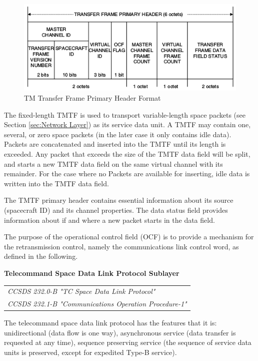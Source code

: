 \begin{figure}[h]
\centering\includegraphics[scale=0.6]{fig/tm_transfer_frame_primary_header_format}
\caption{TM Transfer Frame Primary Header Format}
\label{fig:TM Transfer Frame Primary Header Format}
\end{figure}

The fixed-length TMTF is used to transport variable-length space packets (see Section \ref{sec:Network Layer}) as its service data unit. A TMTF may contain one, several, or zero space packets (in the later case it only contains idle data). Packets are concatenated and inserted into the TMTF until its length is exceeded. Any packet that exceeds the size of the TMTF data field will be split, and starts a new TMTF data field on the same virtual channel with its remainder. For the case where no Packets are available for inserting, idle data is written into the TMTF data field.

The TMTF primary header contains essential information about its source (spacecraft ID) and its channel properties. The data status field provides information about if and where a new packet starts in the data field.

The purpose of the operational control field (OCF) is to provide a mechanism for the retransmission control, namely the communications link control word, as defined in the following.

\textbf{Telecommand Space Data Link Protocol Sublayer}

\begin{tabular}{l}
\textit{CCSDS 232.0-B "TC Space Data Link Protocol" \cite{CCSDS 232.0-B}} \\
\textit{CCSDS 232.1-B "Communications Operation Procedure-1" \cite{CCSDS 232.1-B}}
\end{tabular}

The telecommand space data link protocol has the features that it is: unidirectional (data flow is one way), asynchronous service (data transfer is requested at any time), sequence preserving service (the sequence of service data units is preserved, except for expedited Type-B service).


